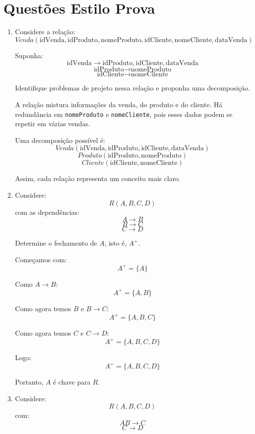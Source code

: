 \documentclass[12pt,a4paper]{article}
\begin{document}
\section{Questões Estilo Prova}

\begin{enumerate}[resume,label=\textbf{Q\arabic*.}]

\item Considere a relação:
\[
Venda(\text{idVenda}, \text{idProduto}, \text{nomeProduto}, \text{idCliente}, \text{nomeCliente}, \text{dataVenda})
\]

Suponha:
\[
\text{idVenda} \rightarrow \text{idProduto}, \text{idCliente}, \text{dataVenda}
\]
\[
\text{idProduto} \rightarrow \text{nomeProduto}
\]
\[
\text{idCliente} \rightarrow \text{nomeCliente}
\]

Identifique problemas de projeto nessa relação e proponha uma decomposição.

\begin{resposta}
A relação mistura informações da venda, do produto e do cliente. Há redundância em \texttt{nomeProduto} e \texttt{nomeCliente}, pois esses dados podem se repetir em várias vendas.

Uma decomposição possível é:
\[
Venda(\text{idVenda}, \text{idProduto}, \text{idCliente}, \text{dataVenda})
\]
\[
Produto(\text{idProduto}, \text{nomeProduto})
\]
\[
Cliente(\text{idCliente}, \text{nomeCliente})
\]

Assim, cada relação representa um conceito mais claro.
\end{resposta}

\item Considere:
\[
R(A, B, C, D)
\]
com as dependências:
\[
A \rightarrow B
\]
\[
B \rightarrow C
\]
\[
C \rightarrow D
\]

Determine o fechamento de $A$, isto é, $A^+$.

\begin{resposta}
Começamos com:
\[
A^+ = \{A\}
\]

Como $A \rightarrow B$:
\[
A^+ = \{A, B\}
\]

Como agora temos $B$ e $B \rightarrow C$:
\[
A^+ = \{A, B, C\}
\]

Como agora temos $C$ e $C \rightarrow D$:
\[
A^+ = \{A, B, C, D\}
\]

Logo:
\[
A^+ = \{A, B, C, D\}
\]

Portanto, $A$ é chave para $R$.
\end{resposta}

\item Considere:
\[
R(A, B, C, D)
\]
com:
\[
AB \rightarrow C
\]
\[
C \rightarrow D
\]


\end{enumerate}
\end{document}
